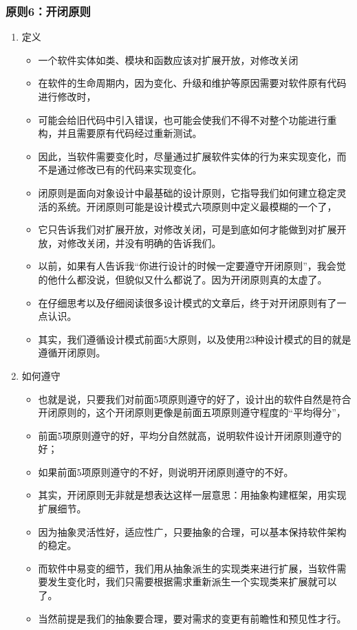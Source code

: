 \documentclass[9pt, b5paper]{article}
\begin{document}
\subsubsection{原则6：开闭原则}
\label{sec:org98aa141}
\begin{enumerate}
\item 定义
\label{sec:orga1f22a8}
\begin{itemize}
\item 一个软件实体如类、模块和函数应该对扩展开放，对修改关闭
\item 在软件的生命周期内，因为变化、升级和维护等原因需要对软件原有代码进行修改时，
\item 可能会给旧代码中引入错误，也可能会使我们不得不对整个功能进行重构，并且需要原有代码经过重新测试。
\item 因此，当软件需要变化时，尽量通过扩展软件实体的行为来实现变化，而不是通过修改已有的代码来实现变化。
\item 闭原则是面向对象设计中最基础的设计原则，它指导我们如何建立稳定灵活的系统。开闭原则可能是设计模式六项原则中定义最模糊的一个了，
\item 它只告诉我们对扩展开放，对修改关闭，可是到底如何才能做到对扩展开放，对修改关闭，并没有明确的告诉我们。
\item 以前，如果有人告诉我“你进行设计的时候一定要遵守开闭原则”，我会觉的他什么都没说，但貌似又什么都说了。因为开闭原则真的太虚了。
\item 在仔细思考以及仔细阅读很多设计模式的文章后，终于对开闭原则有了一点认识。
\item 其实，我们遵循设计模式前面5大原则，以及使用23种设计模式的目的就是遵循开闭原则。
\end{itemize}
\item 如何遵守
\label{sec:org0e26f0d}
\begin{itemize}
\item 也就是说，只要我们对前面5项原则遵守的好了，设计出的软件自然是符合开闭原则的，这个开闭原则更像是前面五项原则遵守程度的“平均得分”，
\item 前面5项原则遵守的好，平均分自然就高，说明软件设计开闭原则遵守的好；
\item 如果前面5项原则遵守的不好，则说明开闭原则遵守的不好。
\item 其实，开闭原则无非就是想表达这样一层意思：用抽象构建框架，用实现扩展细节。
\item 因为抽象灵活性好，适应性广，只要抽象的合理，可以基本保持软件架构的稳定。
\item 而软件中易变的细节，我们用从抽象派生的实现类来进行扩展，当软件需要发生变化时，我们只需要根据需求重新派生一个实现类来扩展就可以了。
\item 当然前提是我们的抽象要合理，要对需求的变更有前瞻性和预见性才行。
\end{itemize}
\end{enumerate}
\end{document}
